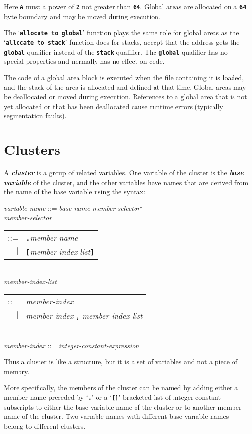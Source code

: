 \documentclass[12pt]{article}
\newcommand{\TT}[1]{{\tt \bfseries #1}}
\newcommand{\key}[1]{{\bf \em #1}\index{#1}}
\newcommand{\mkey}[2]{{\bf \em #1}\index{#1!#2}}
\newenvironment{indpar}[1][0.3in]%
	{\begin{list}{}%
		     {\setlength{\itemsep}{0in}%
		      \setlength{\topsep}{0in}%
		      \setlength{\parsep}{1ex}%
		      \setlength{\labelwidth}{#1}%
		      \setlength{\leftmargin}{#1}%
		      \addtolength{\leftmargin}{\labelsep}}%
	 \item}%
	{\end{list}}
\begin{document}
Here \TT{A} must a power of \TT{2} not greater than \TT{64}.
Global areas are allocated on a \TT{64} byte boundary and
may be moved during execution.

The `\TT{allocate to global}' function plays the same role for
global areas as the `\TT{allocate to stack}' function does for
stacks, accept that the address gets the \TT{global} qualifier
instead of the \TT{stack} qualifier.  The \TT{global} qualifier
has no special properties and normally has no effect on code.

The code of a global area block is executed when the file containing it is
loaded, and the stack of the area is allocated and defined at that
time.  Global areas may be deallocated or moved during execution.
References to a global area
that is not yet allocated or that has been deallocated cause runtime
errors (typically segmentation faults).

\section{Clusters}
\label{CLUSTERS}

A \key{cluster} is a group of related variables.  One variable of
the cluster is the \mkey{base variable}{of cluster} of the cluster, and the
other variables have names that are derived from the
name of the base variable using the syntax:


\begin{indpar}
{\em variable-name} ::=
    {\em base-name} {\em member-selector}$^\star$ \\[1ex]
{\em member-selector} \begin{tabular}[t]{@{}rl}
    ::= & \TT{.}{\em member-name} \\
    $|$ & \TT{[}{\em member-index-list}\TT{]}
    \end{tabular} \\[1ex]
{\em member-index-list} \begin{tabular}[t]{@{}rl}
    ::= & {\em member-index} \\
    $|$ & {\em member-index} \TT{,} {\em member-index-list}
    \end{tabular} \\[1ex]
{\em member-index} ::= {\em integer-constant-expression}
\end{indpar}

Thus a cluster
is like a structure, but it is a set of variables and not a
piece of memory.

More specifically, the members of the cluster can be named by
adding either a member name preceded by `\TT{.}' or a
`\TT{[]}' bracketed list of
integer constant subscripts to
either the base variable name of the cluster or to another member name
of the cluster.  Two variable names with different base variable names
belong to different clusters.
\end{document}
